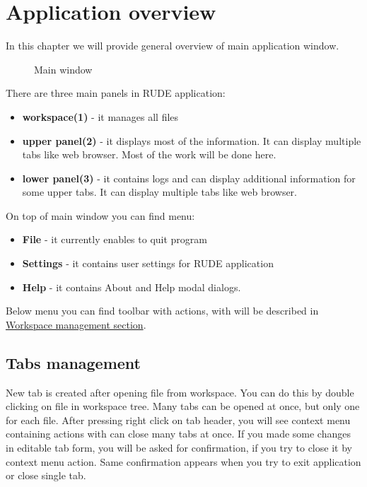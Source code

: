 \section{Application overview}\label{section:overview}

In this chapter we will provide general overview of main application window.

\begin{figure*}[!ht] 
	\centering
	\caption{Main window}
\end{figure*}

There are three main panels in RUDE application:
\begin{itemize}
	\item \textbf{workspace(1)} - it manages all files
	\item \textbf{upper panel(2)} - it displays most of the information. It can display multiple tabs like web browser. Most of the work will be done here.
	\item \textbf{lower panel(3)} - it contains logs and can display additional information for some upper tabs. It can display multiple tabs like web browser.
\end{itemize}

On top of main window you can find menu:
\begin{itemize}
	\item \textbf{File} - it currently enables to quit program
	\item \textbf{Settings} - it contains user settings for RUDE application
	\item \textbf{Help} - it contains About and Help modal dialogs.
\end{itemize}

Below menu you can find toolbar with actions, with will be described in \hyperref[section:workspace]{Workspace management section}.


\subsection{Tabs management}\label{sub:overview-tab}
New tab is created after opening file from workspace. You can do this by double clicking on file in workspace tree. Many tabs can be opened at once, but only one for each file. After pressing right click on tab header, you will see context menu containing actions with can close many tabs at once. If you made some changes in editable tab form, you will be asked for confirmation, if you try to close it by context menu action. Same confirmation appears when you try to exit application or close single tab.\\

